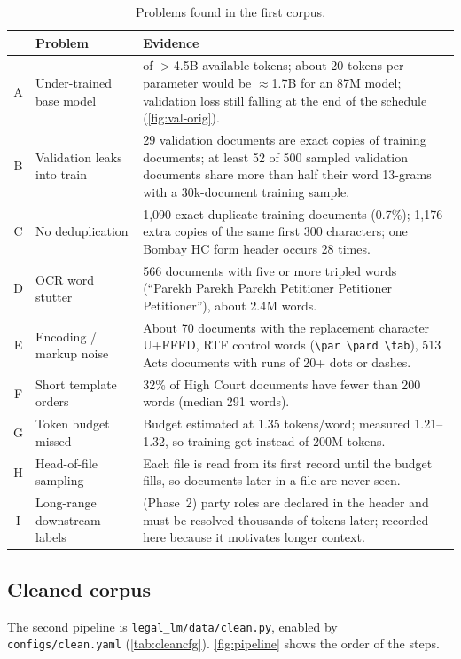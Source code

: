 \documentclass[11pt,a4paper]{article}
\newcommand{\code}[1]{\texttt{\small #1}}
\newcommand{\bs}{\textbackslash}
\begin{document}
\begin{table}[H]\centering\small
\caption{Problems found in the first corpus.}\label{tab:audit}
\begin{tabularx}{\linewidth}{clX}\toprule
& Problem & Evidence\\\midrule
A & Under-trained base model & \oldtraintokens{} of $>$4.5B available tokens; about 20 tokens per parameter
\cite{hoffmann2022chinchilla} would be $\approx$1.7B for an 87M model; validation loss still falling at the end
of the schedule (\autoref{fig:val-orig}).\\
B & Validation leaks into train & 29 validation documents are exact copies of training documents; at least
52 of 500 sampled validation documents share more than half their word 13-grams with a 30k-document training
sample.\\
C & No deduplication & 1{,}090 exact duplicate training documents (0.7\%); 1{,}176 extra copies of the same
first 300 characters; one Bombay HC form header occurs 28 times.\\
D & OCR word stutter & 566 documents with five or more tripled words (``Parekh Parekh Parekh Petitioner
Petitioner Petitioner''), about 2.4M words.\\
E & Encoding / markup noise & About 70 documents with the replacement character U+FFFD, RTF control words
(\code{\bs par \bs pard \bs tab}), 513 Acts documents with runs of 20+ dots or dashes.\\
F & Short template orders & 32\% of High Court documents have fewer than 200 words (median 291 words).\\
G & Token budget missed & Budget estimated at 1.35 tokens/word; measured 1.21--1.32, so training got
\oldtraintokens{} instead of 200M tokens.\\
H & Head-of-file sampling & Each file is read from its first record until the budget fills, so documents
later in a file are never seen.\\
I & Long-range downstream labels & (Phase~2) party roles are declared in the header and must be resolved
thousands of tokens later; recorded here because it motivates longer context.\\
\bottomrule\end{tabularx}\end{table}

\subsection{Cleaned corpus}\label{sec:cleaning}
The second pipeline is \code{legal\_lm/data/clean.py}, enabled by \code{configs/clean.yaml}
(\autoref{tab:cleancfg}).  \autoref{fig:pipeline} shows the order of the steps.
\end{document}
